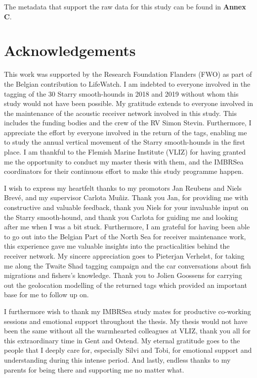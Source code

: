\documentclass[
  authoryear,
  review,
  3p]{elsarticle}
\begin{document}
The metadata that support the raw data for this study can be found in
\textbf{Annex C}.

\hypertarget{acknowledgements}{%
\section*{Acknowledgements}\label{acknowledgements}}

This work was supported by the Research Foundation Flanders (FWO) as
part of the Belgian contribution to LifeWatch. I am indebted to everyone
involved in the tagging of the 30 Starry smooth-hounds in 2018 and 2019
without whom this study would not have been possible. My gratitude
extends to everyone involved in the maintenance of the acoustic receiver
network involved in this study. This includes the funding bodies and the
crew of the RV Simon Stevin. Furthermore, I appreciate the effort by
everyone involved in the return of the tags, enabling me to study the
annual vertical movement of the Starry smooth-hounds in the first place.
I am thankful to the Flemish Marine Institute (VLIZ) for having granted
me the opportunity to conduct my master thesis with them, and the
IMBRSea coordinators for their continuous effort to make this study
programme happen.

I wish to express my heartfelt thanks to my promotors Jan Reubens and
Niels Brevé, and my supervisor Carlota Muñiz. Thank you Jan, for
providing me with constructive and valuable feedback, thank you Niels
for your invaluable input on the Starry smooth-hound, and thank you
Carlota for guiding me and looking after me when I was a bit stuck.
Furthermore, I am grateful for having been able to go out into the
Belgian Part of the North Sea for receiver maintenance work, this
experience gave me valuable insights into the practicalities behind the
receiver network. My sincere appreciation goes to Pieterjan Verhelst,
for taking me along the Twaite Shad tagging campaign and the car
conversations about fish migrations and fishers's knowledge. Thank you
to Jolien Goossens for carrying out the geolocation modelling of the
returned tags which provided an important base for me to follow up on.

I furthermore wish to thank my IMBRSea study mates for productive
co-working sessions and emotional support throughout the thesis. My
thesis would not have been the same without all the warmhearted
colleagues at VLIZ, thank you all for this extraordinary time in Gent
and Ostend. My eternal gratitude goes to the people that I deeply care
for, especially Silvi and Tobi, for emotional support and understanding
during this intense period. And lastly, endless thanks to my parents for
being there and supporting me no matter what.
\end{document}

